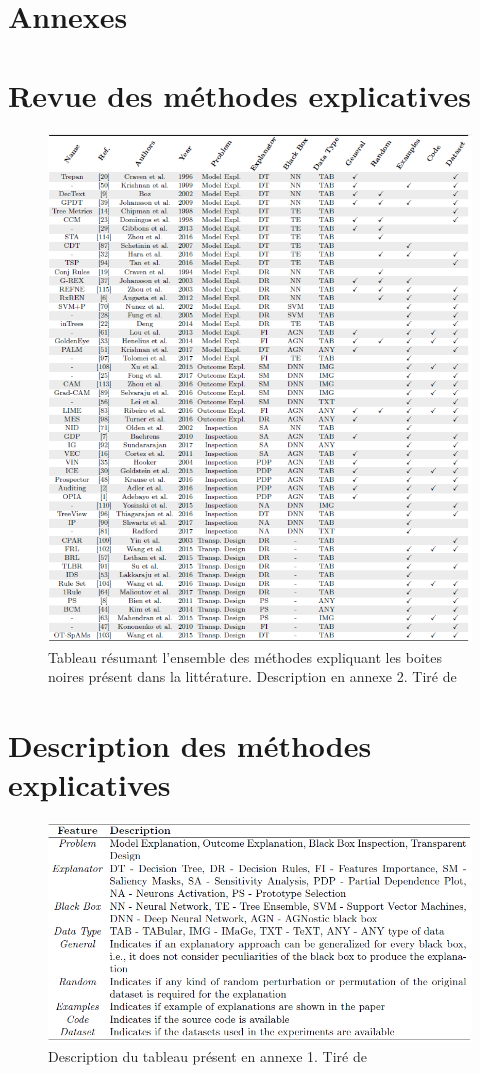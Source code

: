 \section{Annexes}
\appendix
\makeatletter
\def\@seccntformat#1{Annexe~\csname the#1\endcsname:\quad}
\makeatother

\section{Revue des méthodes explicatives}
\begin{figure}[h]
\centering
\includegraphics[scale=1.01]{src_img/tabSummary.PNG}
\caption{Tableau résumant l'ensemble des méthodes expliquant les boites noires présent dans la littérature. Description en annexe 2. Tiré de \cite{surveyExplaining}}
\label{tabSummary}
\end{figure}

\newpage

\section{Description des méthodes explicatives}
\begin{figure}[h]
\centering
\includegraphics[scale=1.01]{src_img/descSummary.PNG}
\caption{Description du tableau présent en annexe 1. Tiré de \cite{surveyExplaining}}
\label{descSummary}
\end{figure}